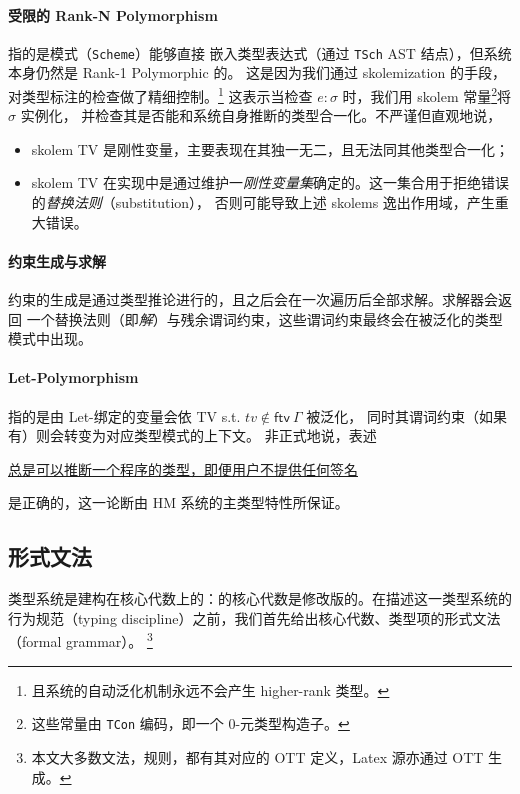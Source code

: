 \documentclass[a4paper, 11pt]{article}
\theoremstyle{remark}\newtheorem*{remark}{Remark}
\theoremstyle{definition}\newtheorem*{definition}{Definition}
\begin{document}
\paragraph{受限的 Rank-N Polymorphism} 指的是模式（\texttt{Scheme}）能够直接
嵌入类型表达式（通过 \texttt{TSch} AST 结点），但系统本身仍然是 Rank-1 Polymorphic 的。
这是因为我们通过 skolemization 的手段，对类型标注的检查做了精细控制。\footnote{
  且系统的自动泛化机制永远不会产生 higher-rank 类型。
}
这表示当检查 \(e : \sigma\) 时，我们用 skolem 常量\footnote{
  这些常量由 \texttt{TCon} 编码，即一个 0-元类型构造子。
}将 \(\sigma\) 实例化，
并检查其是否能和系统自身推断的类型合一化。不严谨但直观地说，
\begin{itemize}
  \item skolem TV 是刚性变量，主要表现在其独一无二，且无法同其他类型合一化；
  \item skolem TV 在实现中是通过维护一\emph{刚性变量集}确定的。这一集合用于拒绝错误的\emph{替换法则}（substitution），
    否则可能导致上述 skolems 逸出作用域，产生重大错误。
\end{itemize}
\paragraph{约束生成与求解} 约束的生成是通过类型推论进行的，且之后会在一次遍历后全部求解。求解器会返回
一个替换法则（即\emph{解}）与残余谓词约束，这些谓词约束最终会在被泛化的类型模式中出现。
\paragraph{Let-Polymorphism} 指的是由 Let-绑定的变量会依 TV s.t. $tv\notin\mathsf{ftv}\ \Gamma$ 被泛化，
同时其谓词约束（如果有）则会转变为对应类型模式的上下文。
非正式地说，表述
\begin{center}
  \underline{总是可以推断一个程序的类型，即便用户不提供任何签名}
\end{center}
是正确的，这一论断由 HM 系统的主类型特性所保证。

\subsection{形式文法}

类型系统是建构在核心代数上的：\Tigris 的核心代数是修改版的\lambdacalc。在描述这一类型系统的
行为规范（typing discipline）之前，我们首先给出核心代数、类型项的形式文法（formal grammar）。
\footnote{本文大多数文法，规则，都有其对应的 OTT 定义，Latex 源亦通过 OTT 生成。}
\end{document}

